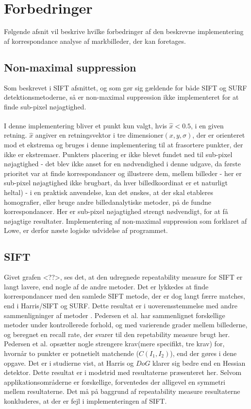 \section{Forbedringer}
Følgende afsnit vil beskrive hvilke forbedringer af den beskrevne implementering af korrespondance analyse af markbilleder, der kan foretages. 

\subsection{Non-maximal suppression}
Som beskrevet i SIFT afsnittet, og som gør sig gældende for både SIFT og SURF detektionsmetoderne, så er non-maximal suppression ikke implementeret for at finde sub-pixel nøjagtighed. 
\\
\\
I denne implementering bliver et punkt kun valgt, hvis $\hat{x} < 0.5$, i en given retning. $\hat{x}$ angiver en retningsvektor i tre dimensioner$(x, y, \sigma)$, der er orienteret mod et ekstrema og bruges i denne implementering til at frasortere punkter, der ikke er ekstremaer. Punkters placering er ikke blevet fundet ned til sub-pixel nøjagtighed - det blev ikke anset for en nødvendighed i denne udgave, da første prioritet var at finde korrespondancer og illustrere dem, mellem billeder - her er sub-pixel nøjagtighed ikke brugbart, da hver billedkoordinat er et naturligt heltal) - i en praktisk anvendelse, kan det ønskes, at der skal etableres homografier, eller bruge andre billedanalytiske metoder, på de fundne korrespondancer. Her er sub-pixel nøjagtighed strengt nødvendigt, for at få nøjagtige resultater. Implementering af non-maximal suppression som forklaret af Lowe, er derfor næste logiske udvidelse af programmet. 

\subsection{SIFT}
Givet grafen <??>, ses det, at den udregnede repeatability measure for SIFT er langt lavere, end nogle af de andre metoder. Det er lykkedes at finde korrespondancer med den samlede SIFT metode, der er dog langt færre matches, end i Harris/SIFT og SURF. Dette resultat er i uoverensstemmelse med andre sammenligninger af metoder\cite{kim} \cite{kim2}. Pedersen et al. har sammenlignet forskellige metoder under kontrollerede forhold, og med varierende grader mellem billederne, og beregnet en recall rate, der svarer til den repetability measure brugt her. Pedersen et al. opsætter nogle strengere krav(mere specifikt, tre krav) for, hvornår to punkter er potnetielt matchende ($C(I_1, I_2)$), end der gøres i dene opgave. Det er i studierne vist, at Harris og $DoG$ klarer sig bedre end en Hessian detektor. Dette resultat er i modstrid med resultaterne præsenteret her. Selvom applikationsområderne er forskellige, forventedes der alligevel en symmetri mellem resultaterne. Det må på baggrund af repeatability measure resultaterne konkluderes, at der er fejl i implementeringen af SIFT. 

